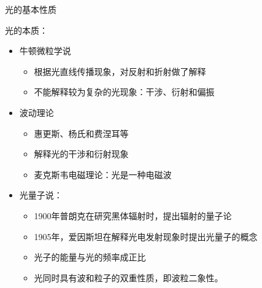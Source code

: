 \documentclass[trans]{beamer} %
\begin{document}
\begin{frame}[fragile]{光的基本性质}
\begin{alertblock}{光的本质：}
	
	\end{alertblock}
	
	
  \begin{itemize}
    \item 牛顿微粒学说
        \begin{itemize}
           \item<2-| alert@2>[-] 根据光直线传播现象，对反射和折射做了解释
           \item<2-| alert@3>[-]  不能解释较为复杂的光现象：干涉、衍射和偏振
         \end{itemize}
    \item 波动理论
        \begin{itemize}
           \item<2-| alert@4>[-]  惠更斯、杨氏和费涅耳等
           \item<2-| alert@5>[-]  解释光的干涉和衍射现象
            \item<2-| alert@6>[-]  麦克斯韦电磁理论：光是一种电磁波
         \end{itemize}
    \item 光量子说：
        \begin{itemize}
           \item<2-| alert@7>[-]  1900年普朗克在研究黑体辐射时，提出辐射的量子论
           \item<2-| alert@8>[-]  1905年，爱因斯坦在解释光电发射现象时提出光量子的概念
           \item<2-| alert@9>[-]  光子的能量与光的频率成正比
           \item<2-| alert@10>[-] 光同时具有波和粒子的双重性质，即波粒二象性。
         \end{itemize} 
 \end{itemize}

  
  
\end{frame}
\end{document}
